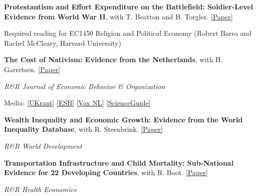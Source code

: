 \documentclass[letterpaper]{article}
\renewenvironment{itemize}{
  \begin{list}{}{
    \setlength{\leftmargin}{1.5em}
  }
}{
  \end{list}
}
\begin{document}
				\begin{itemize}
				
					\item \textbf{Protestantism and Effort Expenditure on the Battlefield: Soldier-Level Evidence from World War II}, with T. Beatton and B. Torgler. \href{https://ahmedskali.com/papers/ProtestantSoldiersAug2024.pdf}{[Paper]}
	
	\begin{itemize}
		\item 	Required reading for EC1450 Religion and Political Economy (Robert Barro and Rachel McCleary, Harvard University)
		\end{itemize}
		
		\medskip
		
				\item {\bf The Cost of Nativism: Evidence from the Netherlands}, with H. Garretsen. 
 \href{https://ahmedskali.com/papers/LanguagePaper.pdf}{[Paper]}
 

 \begin{itemize}
 							\item \textit{R\&R Journal of Economic Behavior \& Organization}

 	\item Media: \href{https://ukrant.nl/research-switching-to-dutch-will-cost-universities-a-lot-of-money-and-publications/?lang=en}{[UKrant]} \href{https://esb.nu/nederlands-schaadt-economie/}{[ESB]}  \href{https://www.voxweb.nl/nieuws/geen-colleges-meer-in-het-engels-kost-nederland-veel-geld-op-de-lange-termijn?medium=email}{[Vox NL]}	\href{https://www.scienceguide.nl/2024/10/meer-nederlands-in-hoger-onderwijs-kost-ons-land-veel-welvaart-toont-rug-onderzoek/}{[ScienceGuide]}
	
	\end{itemize}
	
\medskip
				
						\item \textbf{Wealth Inequality and Economic Growth: Evidence from the World Inequality Database}, with R. Steenbrink.  \href{https://www.econstor.eu/handle/10419/289584}{[Paper]}
 
						\begin{itemize}
							\item \textit{R\&R World Development}
							\end{itemize}
	
		\medskip


		\item \textbf{Transportation Infrastructure and Child Mortality: Sub-National Evidence for 22 Developing Countries}, with R. Boot.  \href{https://ahmedskali.com/papers/TransportationCM.pdf}{[Paper]}
								\begin{itemize}
							\item \textit{R\&R Health Economics}
							\end{itemize}
								

\end{itemize}
\end{document}
